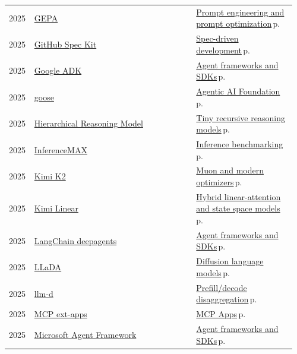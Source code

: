 \documentclass[10pt,a4paper,openany]{report}
\begin{document}
{\begin{longtable}{@{}p{0.07\linewidth}>{\raggedright}p{0.55\linewidth}>{\raggedright\arraybackslash}p{0.34\linewidth}@{}}
2025 & \href{https://github.com/gepa-ai/gepa}{GEPA} & \hyperref[c:practice-3]{Prompt engineering and prompt optimization}\,{\color{muted}\scriptsize p.\,\pageref{c:practice-3}}\\
2025 & \href{https://github.com/github/spec-kit}{GitHub Spec Kit} & \hyperref[c:coding-3]{Spec-driven development}\,{\color{muted}\scriptsize p.\,\pageref{c:coding-3}}\\
2025 & \href{https://github.com/google/adk-python}{Google ADK} & \hyperref[c:agents-12]{Agent frameworks and SDKs}\,{\color{muted}\scriptsize p.\,\pageref{c:agents-12}}\\
2025 & \href{https://github.com/block/goose}{goose} & \hyperref[c:protocols-4]{Agentic AI Foundation}\,{\color{muted}\scriptsize p.\,\pageref{c:protocols-4}}\\
2025 & \href{https://github.com/sapientinc/HRM}{Hierarchical Reasoning Model} & \hyperref[c:arch-10]{Tiny recursive reasoning models}\,{\color{muted}\scriptsize p.\,\pageref{c:arch-10}}\\
2025 & \href{https://github.com/InferenceMAX/InferenceMAX}{InferenceMAX} & \hyperref[c:inference-8]{Inference benchmarking}\,{\color{muted}\scriptsize p.\,\pageref{c:inference-8}}\\
2025 & \href{https://github.com/MoonshotAI/Kimi-K2}{Kimi K2} & \hyperref[c:training-2]{Muon and modern optimizers}\,{\color{muted}\scriptsize p.\,\pageref{c:training-2}}\\
2025 & \href{https://github.com/MoonshotAI/Kimi-Linear}{Kimi Linear} & \hyperref[c:arch-4]{Hybrid linear-attention and state space models}\,{\color{muted}\scriptsize p.\,\pageref{c:arch-4}}\\
2025 & \href{https://github.com/langchain-ai/deepagents}{LangChain deepagents} & \hyperref[c:agents-12]{Agent frameworks and SDKs}\,{\color{muted}\scriptsize p.\,\pageref{c:agents-12}}\\
2025 & \href{https://github.com/ML-GSAI/LLaDA}{LLaDA} & \hyperref[c:arch-5]{Diffusion language models}\,{\color{muted}\scriptsize p.\,\pageref{c:arch-5}}\\
2025 & \href{https://github.com/llm-d/llm-d}{llm-d} & \hyperref[c:inference-3]{Prefill/decode disaggregation}\,{\color{muted}\scriptsize p.\,\pageref{c:inference-3}}\\
2025 & \href{https://github.com/modelcontextprotocol/ext-apps}{MCP ext-apps} & \hyperref[c:protocols-1]{MCP Apps}\,{\color{muted}\scriptsize p.\,\pageref{c:protocols-1}}\\
2025 & \href{https://github.com/microsoft/agent-framework}{Microsoft Agent Framework} & \hyperref[c:agents-12]{Agent frameworks and SDKs}\,{\color{muted}\scriptsize p.\,\pageref{c:agents-12}}\\

\end{longtable}}
\end{document}
